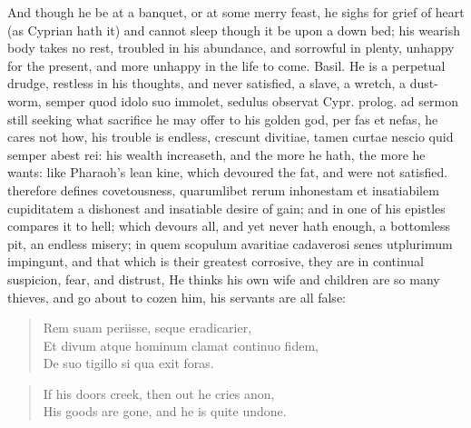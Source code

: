 {And though he be at a banquet, or at some merry feast, he sighs for
grief of heart (as Cyprian hath it) and cannot sleep though it be
upon a down bed; his wearish body takes no rest, troubled in his
abundance, and sorrowful in plenty, unhappy for the present, and more
unhappy in the life to come. Basil. He is a perpetual drudge,
restless in his thoughts, and never satisfied, a slave, a wretch,
a dust-worm, semper quod idolo suo immolet, sedulus observat Cypr.
prolog. ad sermon still seeking what sacrifice he may offer to his
golden god, per fas et nefas, he cares not how, his trouble is endless,
crescunt divitiae, tamen curtae nescio quid semper abest rei: his
wealth increaseth, and the more he hath, the more he wants: like
Pharaoh's lean kine, which devoured the fat, and were not satisfied.
\Austin{} therefore defines covetousness, quarumlibet rerum
inhonestam et insatiabilem cupiditatem a dishonest and insatiable
desire of gain; and in one of his epistles compares it to hell;
which devours all, and yet never hath enough, a bottomless pit,
an endless misery; in quem scopulum avaritiae cadaverosi senes
utplurimum impingunt, and that which is their greatest corrosive, they
are in continual suspicion, fear, and distrust, He thinks his own wife
and children are so many thieves, and go about to cozen him, his
servants are all false:
%
\begin{verse}
\textlatin{Rem suam periisse, seque eradicarier},\\
\textlatin{Et divum atque hominum clamat continuo fidem},\\
\textlatin{De suo tigillo si qua exit foras}.
\end{verse}
\translationrule
\begin{verse}
If his doors creek, then out he cries anon,\\
His goods are gone, and he is quite undone.
\end{verse}

}
